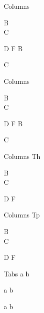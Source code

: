 \documentclass[english,notes]{beamer}
\begin{document}
\begin{frame}{Columns}
    \begin{cols}

            B\\
            C

            D
            F
            B

            C
    \end{cols}
\end{frame}

\begin{frame}{Columns}
    \begin{cols}

            B\\
            C

            D
            F
            \vspace{-\topskip}
            \Huge B

            C
    \end{cols}
\end{frame}

\begin{frame}{Columns}
    Th
    \begin{cols}

            B\\
            C

            D
            F
    \end{cols}
\end{frame}

\begin{frame}{Columns}
    Tp
    \begin{cols}

            B\\
            C

            D
            F
    \end{cols}
\end{frame}

\begin{frame}{Tabs}
a \tab b

a  b

a  b
\end{frame}
\end{document}
